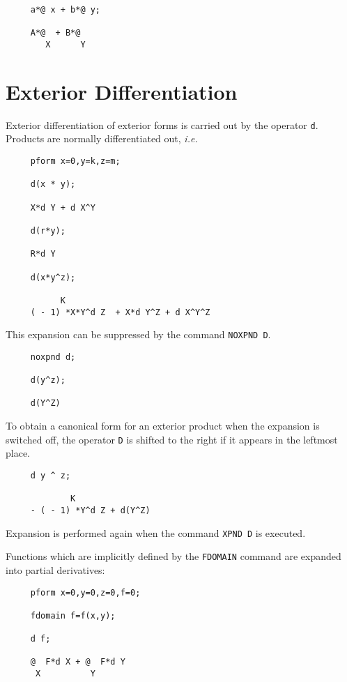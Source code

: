 \example{}

\begin{verbatim}
     a*@ x + b*@ y;

     A*@  + B*@
        X      Y
\end{verbatim}

\section{Exterior Differentiation}
Exterior differentiation of exterior forms is carried out by the
operator {\tt d}\label{d}.  Products are normally differentiated out,
{\em i.e.}

\begin{verbatim}
     pform x=0,y=k,z=m;

     d(x * y);

     X*d Y + d X^Y

     d(r*y);

     R*d Y

     d(x*y^z);

           K
     ( - 1) *X*Y^d Z  + X*d Y^Z + d X^Y^Z
\end{verbatim}

This expansion can be suppressed by the command {\tt NOXPND D}\label{NOXPNDD}.

\begin{verbatim}
     noxpnd d;

     d(y^z);

     d(Y^Z)
\end{verbatim}

To obtain a canonical form for an exterior product when the expansion
is switched off, the operator {\tt D} is shifted to the right if it
appears in the leftmost place.

\begin{verbatim}
     d y ^ z;

             K
     - ( - 1) *Y^d Z + d(Y^Z)
\end{verbatim}

Expansion is performed again when the command {\tt XPND D}\label{XPNDD}
is executed. 

Functions which are implicitly defined by the {\tt FDOMAIN} command are
expanded into partial derivatives:

\begin{verbatim}
     pform x=0,y=0,z=0,f=0;

     fdomain f=f(x,y);

     d f;

     @  F*d X + @  F*d Y
      X          Y
\end{verbatim}

